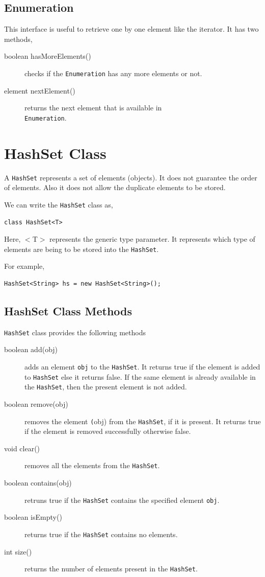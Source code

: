 \documentclass[11pt,a4paper]{article}
\begin{document}
\subsection*{Enumeration}
This interface is useful to retrieve one by one element like the iterator. It has two methods,
\begin{description}
\item [boolean hasMoreElements()] checks if the \texttt{Enumeration} has any more elements or not.
\item [element nextElement()] returns the next element that is available in\\
 \texttt{Enumeration}.
\end{description}

\section*{HashSet Class}
A \texttt{HashSet} represents a set of elements (objects). It does not guarantee the order of elements. Also it does not allow the duplicate elements to be stored.

We can write the \texttt{HashSet} class as,
\begin{lstlisting}[numbers=none]
        class HashSet<T>
\end{lstlisting}
Here, $<$T$>$ represents the generic type parameter. It represents which type of elements are being to be stored into the \texttt{HashSet}.

For example,
\begin{lstlisting}[numbers=none]
        HashSet<String> hs = new HashSet<String>();
\end{lstlisting}

\subsection*{HashSet Class Methods}
\texttt{HashSet} class provides the following methods
\begin{description}
\item [boolean add(obj)] adds an element \texttt{obj} to the \texttt{HashSet}. It returns true if the element is added to \texttt{HashSet} else it returns false. If the same element is already available in the \texttt{HashSet}, then the present element is not added.
\item [boolean remove(obj)] removes the element \texttt(obj) from the \texttt{HashSet}, if it is present. It returns true if the element is removed successfully otherwise false.
\item [void clear()] removes all the elements from the \texttt{HashSet}.
\item [boolean contains(obj)] retruns true if the \texttt{HashSet} contains the specified element \texttt{obj}.

\item [boolean isEmpty()] returns true if the \texttt{HashSet} contains no elements.
\item [int size()] returns the number of elements present in the \texttt{HashSet}.
\end{description}
\end{document}
